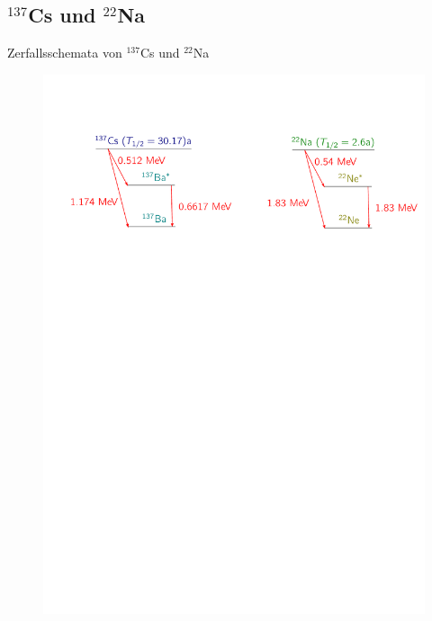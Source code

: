 \documentclass[xcolor=x11names,compress]{beamer}
\renewcommand{\(}{\begin{columns}}
\renewcommand{\)}{\end{columns}}
\newcommand{\<}[1]{\begin{column}{#1}}
\renewcommand{\>}{\end{column}}
\begin{document}
\subsection{$^{137}$Cs und  $^{22}$Na}
\begin{frame}[t]{Zerfallsschemata von $^{137}$Cs und  $^{22}$Na}
 \begin{figure}[htpb]
    \centering
    \includegraphics[width=1.0\linewidth]{../figures/terms}
\label{fig:term_schemata}
\end{figure}
\end{frame}
\end{document}
